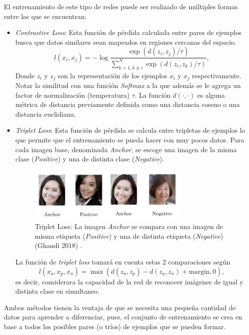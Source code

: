\vspace{0.2cm}

El entrenamiento de este tipo de redes puede ser realizado de múltiples formas entre las que se encuentran: 

\begin{itemize}
    \item \textit{Contrastive Loss}: Esta función de pérdida calculada entre pares de ejemplos busca que datos similares sean mapeados en regiones cercanas del espacio.
    \[
    l(x_i , x_j) = -\log\frac{\exp(d(z_i , z_j)/\tau)}{\sum_{k=1 , k \neq i}^N \exp(d(z_i , z_k)/\tau)} , 
    \]
    Donde $z_i$ y $z_j$ son la representación de los ejemplos $x_i$ y $x_j$ respectivamente. Notar la similitud con una función \textit{Softmax} a la que además se le agrega un factor de normalización (temperatura) $\tau$. La función $d(\cdot, \cdot)$ es alguna métrica de distancia previamente  definida como una distancia coseno o una distancia euclidiana. 
    
    \item \textit{Triplet Loss}: Esta función de pérdida se calcula entre tripletas de ejemplos lo que permite que el entrenamiento se pueda hacer con muy pocos datos. Para cada imagen base, denominada \textit{Anchor}, se escoge una imagen de la misma clase (\textit{Positive}) y una de distinta clase (\textit{Negative}).
    
    \begin{figure}[ht]
    \centering
    \includegraphics[width=8cm]{img/tesis/triplet_loss.jpeg}
    \caption{Triplet Loss: La imagen \textit{Anchor} se compara con una imagen de misma etiqueta (\textit{Positive}) y una de distinta etiqueta (\textit{Negative}) (Ghandi 2018) \cite{TripletLoss}.}
    \label{fig:triplet_loss}
    \end{figure}
    
    \noindent La función de \textit{triplet loss} tomará en cuenta estas 2 comparaciones según
    \[
    l(x_a , x_p, x_n) = \max(d(z_a, z_p) - d(z_a, z_n) + \text{margin} , 0) , 
    \]
    es decir, considerara la capacidad de la red de reconocer imágenes de igual y distinta clase en simultaneo. 
    
    
\end{itemize}

Ambos métodos tienen la ventaja de que se necesita una pequeña cantidad de datos para aprender a diferenciar, pues, el conjunto de entrenamiento se crea en base a todos los posibles pares (o tríos) de ejemplos que se pueden formar.






